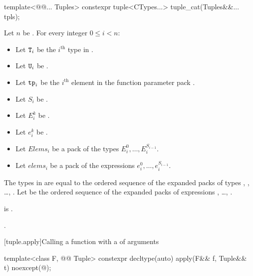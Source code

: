 \begin{itemdecl}
template<@@... Tuples>
  constexpr tuple<CTypes...> tuple_cat(Tuples&&... tpls);
\end{itemdecl}

\begin{itemdescr}
\pnum
Let $n$ be .
For every integer $0 \leq i < n$:
\begin{itemize}
\item
Let $\texttt{T}_i$ be the $i^\text{th}$ type in .
\item
Let $\texttt{U}_i$ be .
\item
Let $\texttt{tp}_i$ be the $i^\text{th}$ element
in the function parameter pack .
\item
Let $S_i$ be .
\item
Let $E_i^k$ be .
\item
Let $e_i^k$ be .
\item
Let $Elems_i$ be a pack of the types $E_i^0, \dotsc, E_i^{S_{i-1}}$.
\item
Let $elems_i$ be a pack of the expressions $e_i^0, \dotsc, e_i^{S_{i-1}}$.
\end{itemize}
The types in  are equal to the ordered sequence of
the expanded packs of types
, , \ldots, .
Let  be the ordered sequence of
the expanded packs of expressions
, \ldots, .

\pnum
\mandates
{} is .

\pnum
\returns
{}.
\end{itemdescr}

[tuple.apply]{Calling a function with a  of arguments}

%
\begin{itemdecl}
template<class F, @@ Tuple>
  constexpr decltype(auto) apply(F&& f, Tuple&& t) noexcept(@\seebelow@);
\end{itemdecl}

